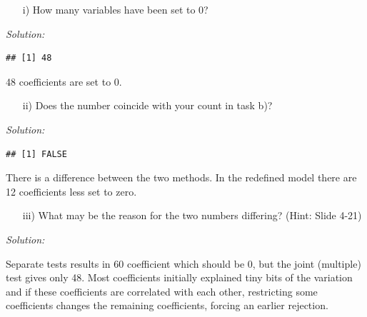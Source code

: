 \documentclass[12pt,a4paper]{article}
\newenvironment{Shaded}{\begin{snugshade}}{\end{snugshade}}
\newcommand{\DecValTok}[1]{\textcolor[rgb]{0.00,0.00,0.81}{#1}}
\newcommand{\FloatTok}[1]{\textcolor[rgb]{0.00,0.00,0.81}{#1}}
\newcommand{\KeywordTok}[1]{\textcolor[rgb]{0.13,0.29,0.53}{\textbf{#1}}}
\newcommand{\NormalTok}[1]{#1}
\newcommand{\OperatorTok}[1]{\textcolor[rgb]{0.81,0.36,0.00}{\textbf{#1}}}
\newcommand{\StringTok}[1]{\textcolor[rgb]{0.31,0.60,0.02}{#1}}
\begin{document}
\begin{itemize}
  \item[i)] How many variables have been set to 0?
\end{itemize}

\emph{Solution:}

\begin{Shaded}
\end{Shaded}

\begin{verbatim}
## [1] 48
\end{verbatim}

48 coefficients are set to 0.

\begin{itemize}
  \item[ii)] Does the number coincide with your count in task b)?
\end{itemize}

\emph{Solution:}

\begin{Shaded}
\end{Shaded}

\begin{verbatim}
## [1] FALSE
\end{verbatim}

There is a difference between the two methods. In the redefined model
there are 12 coefficients less set to zero.

\begin{itemize}
  \item[iii)] What may be the reason for the two numbers differing? (Hint: Slide 4-21)
\end{itemize}

\emph{Solution:}

Separate tests results in 60 coefficient which should be 0, but the
joint (multiple) test gives only 48. Most coefficients initially
explained tiny bits of the variation and if these coefficients are
correlated with each other, restricting some coefficients changes the
remaining coefficients, forcing an earlier rejection.
\end{document}

